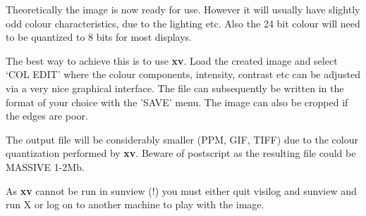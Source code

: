 Theoretically the image is now ready for use.  However it will usually
have slightly odd colour characteristics, due to the lighting etc.  Also
the 24 bit colour will need to be quantized to 8 bits for most displays.

The best way to achieve this is to use {\bf xv}.  Load the created image
and select `COL EDIT' where the colour components, intensity, contrast
etc can be adjusted via a very nice graphical interface.
The file can subsequently
be written in the format of your choice with the 'SAVE' menu.  The image
can also be cropped if the edges are poor.

The output file will be considerably smaller (PPM, GIF, TIFF) due to the colour 
quantization performed by {\bf xv}.  Beware of postscript as the resulting file
could be MASSIVE 1-2Mb.

As {\bf xv} cannot be run in sunview (!) you must either quit visilog and 
sunview
and run X or log on to another machine to play with the image.

